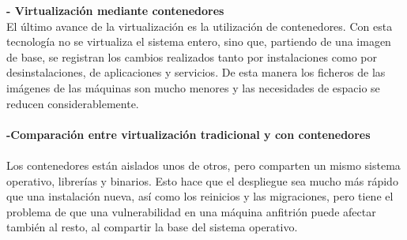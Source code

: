 \documentclass[twoside,twocolumn]{article}
\begin{document}
\begin{flushright}
\begin{itemize}
\textbf{- Virtualización mediante contenedores}\\


El último avance de la virtualización es la utilización de contenedores. Con esta tecnología no se virtualiza el sistema entero, sino que, partiendo de una imagen de base, se registran los cambios realizados tanto por instalaciones como por desinstalaciones, de aplicaciones y servicios. De esta manera los ficheros de las imágenes de las máquinas son mucho menores y las necesidades de espacio se reducen considerablemente.\textbf{}\\
\textbf{}\\
\textbf{-Comparación entre virtualización tradicional y con contenedores}\\\textbf{}\\
Los contenedores están aislados unos de otros, pero comparten un mismo sistema operativo, librerías y binarios. Esto hace que el despliegue sea mucho más rápido que una instalación nueva, así como los reinicios y las migraciones, pero tiene el problema de que una vulnerabilidad en una máquina anfitrión puede afectar también al resto, al compartir la base del sistema operativo.



\end{itemize}
\end{flushright}
\end{document}
